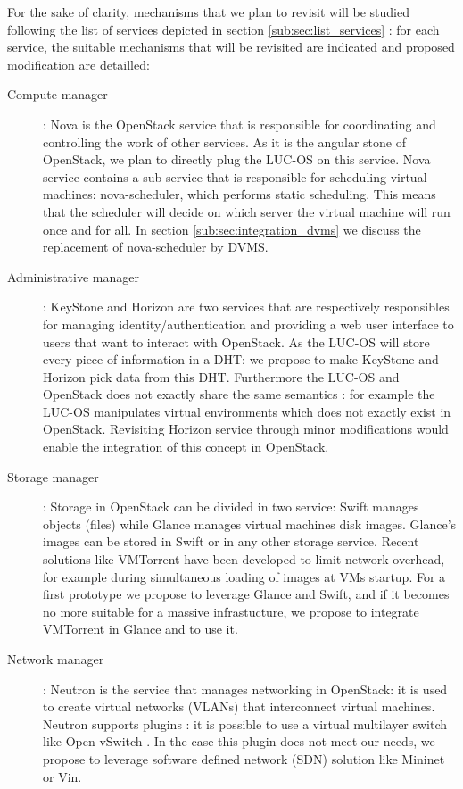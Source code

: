 For the sake of clarity, mechanisms that we plan to revisit will be studied 
following the list of services depicted in section \ref{sub:sec:list_services} :
for each service, the suitable mechanisms that will be revisited are indicated 
and proposed modification are detailled:

\begin{description}

	\item [Compute manager] : Nova is the OpenStack service that is 
	responsible for coordinating and controlling the work of other services.
	As it is the angular stone of OpenStack, we plan to directly plug the 
	LUC-OS on this service. Nova service contains a sub-service that is
	responsible for scheduling virtual machines: nova-scheduler, which performs
	static scheduling. This means that the scheduler will decide on which
	server the virtual machine will run once and for all. In section 
	\ref{sub:sec:integration_dvms} we discuss the replacement of 
	nova-scheduler by DVMS.


	\item [Administrative manager] : KeyStone and Horizon are two services
	that are respectively responsibles for managing identity/authentication
	and providing a web user interface to users that want to interact with
	OpenStack. As the LUC-OS will store every piece of information in a DHT: we
	propose to make KeyStone and Horizon pick data from this DHT. Furthermore 
	the LUC-OS and OpenStack does not exactly share the same semantics : for
	example the LUC-OS manipulates virtual environments which does not
	exactly exist in OpenStack. Revisiting Horizon service through minor
	modifications would enable the integration of this concept in OpenStack.

	\item [Storage manager] : Storage in OpenStack can be divided in two
	service: Swift manages objects (files) while Glance manages virtual machines
	disk images. Glance's images can be stored in Swift or in any other storage
	service. Recent solutions like VMTorrent \cite{reich:2012} have been
	developed to limit network overhead, for example during simultaneous 
	loading of images at VMs startup. For a first prototype we propose to 
	leverage Glance and Swift, and if it becomes no more suitable for a
	massive infrastucture, we propose to integrate VMTorrent in Glance and 
	to use it.

	\item [Network manager] : Neutron is the service that manages networking
	in OpenStack: it is used to create virtual networks (VLANs) that
	interconnect virtual machines. Neutron supports plugins : it is possible
	to use a virtual multilayer switch like Open vSwitch \cite{pfaff:2009}.
	In the case this plugin does not meet our needs, we propose to 
	leverage software defined network (SDN) solution like Mininet 
	\cite{lantz:2010} or Vin.

\end{description}




